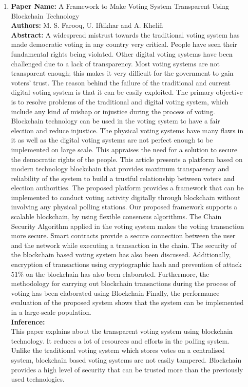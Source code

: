 \documentclass[oneside, 12pt]{book}
\begin{document}
\begin{enumerate}
				\item
					\textbf{Paper Name:} A Framework to Make Voting System Transparent Using Blockchain Technology \cite{farooq2022framework}\\
					\textbf{Authors:} M. S. Farooq, U. Iftikhar and A. Khelifi\\
					\textbf{Abstract:} A widespread mistrust towards the traditional voting system has made democratic voting in any country very critical. People have seen their fundamental rights being violated. Other digital voting systems have been challenged due to a lack of transparency. Most voting systems are not transparent enough; this makes it very difficult for the government to gain voters’ trust. The reason behind the failure of the traditional and current digital voting system is that it can be easily exploited. The primary objective is to resolve problems of the traditional and digital voting system, which include any kind of mishap or injustice during the process of voting. Blockchain technology can be used in the voting system to have a fair election and reduce injustice. The physical voting systems have many flaws in it as well as the digital voting systems are not perfect enough to be implemented on large scale. This appraises the need for a solution to secure the democratic rights of the people. This article presents a platform based on modern technology blockchain that provides maximum transparency and reliability of the system to build a trustful relationship between voters and election authorities. The proposed platform provides a framework that can be implemented to conduct voting activity digitally through blockchain without involving any physical polling stations. Our proposed framework supports a scalable blockchain, by using flexible consensus algorithms. The Chain Security Algorithm applied in the voting system makes the voting transaction more secure. Smart contracts provide a secure connection between the user and the network while executing a transaction in the chain. The security of the blockchain based voting system has also been discussed. Additionally, encryption of transactions using cryptographic hash and prevention of attack 51\% on the blockchain has also been elaborated. Furthermore, the methodology for carrying out blockchain transactions during the process of voting has been elaborated using Blockchain Finally, the performance evaluation of the proposed system shows that the system can be implemented in a large-scale population.\\
					\textbf{Inference:}
					\\This paper explains about the transparent voting system using blockchain technology. It reduces a lot of resources and efforts in the polling system. Unlike the traditional voting system which stores votes on a centralised system, blockchain based voting systems are not easily tampered. Blockchain provides a high level of security that can be trusted more than the previously used technologies.

\end{enumerate}
\end{document}
